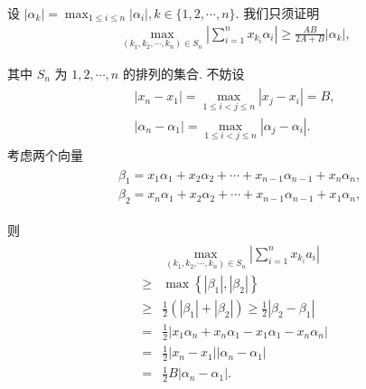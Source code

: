 \begin{solution}
	设 $\left|\alpha_k\right|=\max _{1 \leqslant i \leqslant n}\left|\alpha_i\right|, k \in\{1,2, \cdots, n\}$. 我们只须证明
	\begin{align*}
		\max _{\left(k_1, k_2, \cdots, k_n\right) \in S_n}\left|\sum_{i=1}^n x_{k_i} \alpha_i\right| \geqslant \frac{A B}{2 A+B}\left|\alpha_k\right|,
	\end{align*}

	其中 $S_n$ 为 $1,2, \cdots, n$ 的排列的集合.
	不妨设
	\begin{align*}
		\begin{gathered}
			\left|x_n-x_1\right|=\max _{1 \leqslant i<j \leqslant n}\left|x_j-x_i\right|=B, \\
			\left|\alpha_n-\alpha_1\right|=\max _{1 \leqslant i<j \leqslant n}\left|\alpha_j-\alpha_i\right| .
		\end{gathered}
	\end{align*}
	考虑两个向量
	\begin{align*}
		\begin{aligned}
			 & \beta_1=x_1 \alpha_1+x_2 \alpha_2+\cdots+x_{n-1} \alpha_{n-1}+x_n \alpha_n, \\
			 & \beta_2=x_n \alpha_1+x_2 \alpha_2+\cdots+x_{n-1} \alpha_{n-1}+x_1 \alpha_n,
		\end{aligned}
	\end{align*}

	则
	\begin{align*}
		\begin{aligned}
			          & \max _{\left(k_1, k_2, \cdots, k_n\right) \in S_n}\left|\sum_{i=1}^n x_{k_i} a_i\right|                             \\
			\geqslant & \max \left\{\left|\beta_1\right|,\left|\beta_2\right|\right\}                                                       \\
			\geqslant & \frac{1}{2}\left(\left|\beta_1\right|+\left|\beta_2\right|\right) \geqslant \frac{1}{2}\left|\beta_2-\beta_1\right| \\
			=         & \frac{1}{2}\left|x_1 \alpha_n+x_n \alpha_1-x_1 \alpha_1-x_n \alpha_n\right|                                         \\
			=         & \frac{1}{2}\left|x_n-x_1\right|\left|\alpha_n-\alpha_1\right|                                                       \\
			=         & \frac{1}{2} B\left|\alpha_n-\alpha_1\right| .
		\end{aligned}
	\end{align*}


\end{solution}
